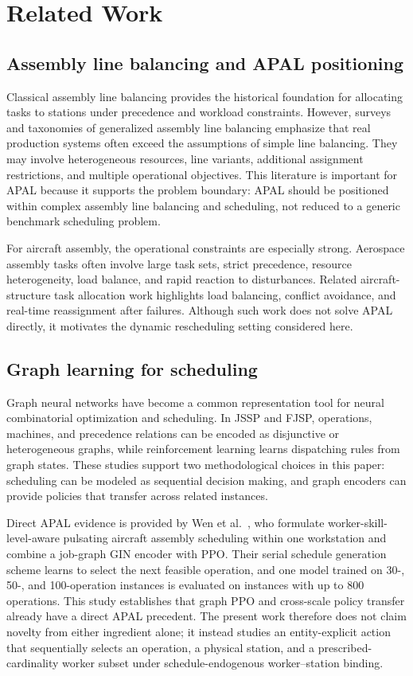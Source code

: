 \section{Related Work}
\label{sec:related}

\subsection{Assembly line balancing and APAL positioning}

Classical assembly line balancing provides the historical foundation for allocating tasks to stations under precedence and workload constraints. However, surveys and taxonomies of generalized assembly line balancing emphasize that real production systems often exceed the assumptions of simple line balancing. They may involve heterogeneous resources, line variants, additional assignment restrictions, and multiple operational objectives. This literature is important for APAL because it supports the problem boundary: APAL should be positioned within complex assembly line balancing and scheduling, not reduced to a generic benchmark scheduling problem.

For aircraft assembly, the operational constraints are especially strong. Aerospace assembly tasks often involve large task sets, strict precedence, resource heterogeneity, load balance, and rapid reaction to disturbances. Related aircraft-structure task allocation work highlights load balancing, conflict avoidance, and real-time reassignment after failures. Although such work does not solve APAL directly, it motivates the dynamic rescheduling setting considered here.

\subsection{Graph learning for scheduling}

Graph neural networks have become a common representation tool for neural combinatorial optimization and scheduling. In JSSP and FJSP, operations, machines, and precedence relations can be encoded as disjunctive or heterogeneous graphs, while reinforcement learning learns dispatching rules from graph states. These studies support two methodological choices in this paper: scheduling can be modeled as sequential decision making, and graph encoders can provide policies that transfer across related instances.

Direct APAL evidence is provided by Wen et al.~\cite{wen2026ginppo}, who formulate worker-skill-level-aware pulsating aircraft assembly scheduling within one workstation and combine a job-graph GIN encoder with PPO. Their serial schedule generation scheme learns to select the next feasible operation, and one model trained on 30-, 50-, and 100-operation instances is evaluated on instances with up to 800 operations. This study establishes that graph PPO and cross-scale policy transfer already have a direct APAL precedent. The present work therefore does not claim novelty from either ingredient alone; it instead studies an entity-explicit action that sequentially selects an operation, a physical station, and a prescribed-cardinality worker subset under schedule-endogenous worker--station binding.

